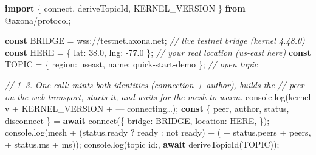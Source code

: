 \documentclass[
  nobib]{tufte-handout}
\newenvironment{Shaded}{}{}
\newcommand{\AttributeTok}[1]{\textcolor[rgb]{0.49,0.56,0.16}{#1}}
\newcommand{\BuiltInTok}[1]{\textcolor[rgb]{0.00,0.50,0.00}{#1}}
\newcommand{\CommentTok}[1]{\textcolor[rgb]{0.38,0.63,0.69}{\textit{#1}}}
\newcommand{\ControlFlowTok}[1]{\textcolor[rgb]{0.00,0.44,0.13}{\textbf{#1}}}
\newcommand{\DataTypeTok}[1]{\textcolor[rgb]{0.56,0.13,0.00}{#1}}
\newcommand{\FloatTok}[1]{\textcolor[rgb]{0.25,0.63,0.44}{#1}}
\newcommand{\FunctionTok}[1]{\textcolor[rgb]{0.02,0.16,0.49}{#1}}
\newcommand{\ImportTok}[1]{\textcolor[rgb]{0.00,0.50,0.00}{\textbf{#1}}}
\newcommand{\KeywordTok}[1]{\textcolor[rgb]{0.00,0.44,0.13}{\textbf{#1}}}
\newcommand{\NormalTok}[1]{#1}
\newcommand{\OperatorTok}[1]{\textcolor[rgb]{0.40,0.40,0.40}{#1}}
\newcommand{\StringTok}[1]{\textcolor[rgb]{0.25,0.44,0.63}{#1}}
\begin{document}
\begin{Shaded}
\begin{Highlighting}[]
\ImportTok{import}\NormalTok{ \{ connect}\OperatorTok{,}\NormalTok{ deriveTopicId}\OperatorTok{,}\NormalTok{ KERNEL\_VERSION \} }\ImportTok{from} \StringTok{\textquotesingle{}@axona/protocol\textquotesingle{}}\OperatorTok{;}

\KeywordTok{const}\NormalTok{ BRIDGE }\OperatorTok{=} \StringTok{\textquotesingle{}wss://testnet.axona.net\textquotesingle{}}\OperatorTok{;}           \CommentTok{// live testnet bridge (kernel 4.48.0)}
\KeywordTok{const}\NormalTok{ HERE   }\OperatorTok{=}\NormalTok{ \{ }\DataTypeTok{lat}\OperatorTok{:} \FloatTok{38.0}\OperatorTok{,} \DataTypeTok{lng}\OperatorTok{:} \OperatorTok{{-}}\FloatTok{77.0}\NormalTok{ \}}\OperatorTok{;}           \CommentTok{// your real location (us{-}east here)}
\KeywordTok{const}\NormalTok{ TOPIC  }\OperatorTok{=}\NormalTok{ \{ }\DataTypeTok{region}\OperatorTok{:} \StringTok{\textquotesingle{}useast\textquotesingle{}}\OperatorTok{,} \DataTypeTok{name}\OperatorTok{:} \StringTok{\textquotesingle{}quick{-}start{-}demo\textquotesingle{}}\NormalTok{ \}}\OperatorTok{;}   \CommentTok{// open topic}

\CommentTok{// 1–3. One call: mints both identities (connection + author), builds the}
\CommentTok{//      peer on the web transport, starts it, and waits for the mesh to warm.}
\BuiltInTok{console}\OperatorTok{.}\FunctionTok{log}\NormalTok{(}\StringTok{\textquotesingle{}kernel v\textquotesingle{}} \OperatorTok{+}\NormalTok{ KERNEL\_VERSION }\OperatorTok{+} \StringTok{\textquotesingle{} — connecting…\textquotesingle{}}\NormalTok{)}\OperatorTok{;}
\KeywordTok{const}\NormalTok{ \{ peer}\OperatorTok{,}\NormalTok{ author}\OperatorTok{,}\NormalTok{ status}\OperatorTok{,}\NormalTok{ disconnect \} }\OperatorTok{=} \ControlFlowTok{await} \FunctionTok{connect}\NormalTok{(\{}
  \DataTypeTok{bridge}\OperatorTok{:}\NormalTok{   BRIDGE}\OperatorTok{,}
  \DataTypeTok{location}\OperatorTok{:}\NormalTok{ HERE}\OperatorTok{,}
\NormalTok{\})}\OperatorTok{;}
\BuiltInTok{console}\OperatorTok{.}\FunctionTok{log}\NormalTok{(}\StringTok{\textquotesingle{}mesh \textquotesingle{}} \OperatorTok{+}\NormalTok{ (status}\OperatorTok{.}\AttributeTok{ready} \OperatorTok{?} \StringTok{\textquotesingle{}ready\textquotesingle{}} \OperatorTok{:} \StringTok{\textquotesingle{}not ready\textquotesingle{}}\NormalTok{) }\OperatorTok{+} \StringTok{\textquotesingle{} (\textquotesingle{}} \OperatorTok{+}\NormalTok{ status}\OperatorTok{.}\AttributeTok{peers} \OperatorTok{+} \StringTok{\textquotesingle{} peers, \textquotesingle{}} \OperatorTok{+}\NormalTok{ status}\OperatorTok{.}\AttributeTok{ms} \OperatorTok{+} \StringTok{\textquotesingle{}ms)\textquotesingle{}}\NormalTok{)}\OperatorTok{;}
\BuiltInTok{console}\OperatorTok{.}\FunctionTok{log}\NormalTok{(}\StringTok{\textquotesingle{}topic id:\textquotesingle{}}\OperatorTok{,} \ControlFlowTok{await} \FunctionTok{deriveTopicId}\NormalTok{(TOPIC))}\OperatorTok{;}


\end{Highlighting}
\end{Shaded}
\end{document}
